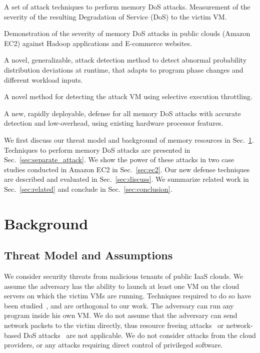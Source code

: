 \documentclass{sig-alternate}
\newcommand{\attackname}{memory DoS attacks\xspace}
\newcommand{\secref}[1]{\mbox{Sec.~\ref{#1}}\xspace}
\newenvironment{packeditemize}{
\begin{list}{}{
\setlength{\labelwidth}{8pt}
\setlength{\itemsep}{0pt}
\setlength{\leftmargin}{\labelwidth}
\addtolength{\leftmargin}{\labelsep}
\setlength{\parindent}{0pt}
\setlength{\listparindent}{\parindent}
\setlength{\parsep}{0pt}
\setlength{\topsep}{3pt}}}{\end{list}}
\begin{document}
\begin{packeditemize}

\item  A set of attack techniques to perform \attackname. Measurement of the 
severity of the resulting Degradation of Service (DoS) to the victim VM.

\item Demonstration of the severity of \attackname in public clouds (Amazon 
EC2) against Hadoop applications and E-commerce websites. 

\item A novel, generalizable, attack detection method to detect abnormal 
probability distribution deviations at runtime, that adapts to program phase 
changes and different workload inputs.

\item A novel method for detecting the attack VM using selective execution throttling.

\item A new, rapidly deployable, defense for all \attackname with accurate detection and low-overhead, using existing hardware processor features.

\end{packeditemize}

We first discuss our threat model 
and background of memory resources in \secref{sec:overview}. Techniques to 
perform \attackname are presented in \secref{sec:separate_attack}. We 
show the power of these attacks in two case studies conducted in Amazon EC2 
in \secref{sec:ec2}. Our new defense techniques are described and evaluated in
\secref{sec:discuss}. We summarize related work in \secref{sec:related} and
conclude in \secref{sec:conclusion}.


\section{Background}
\label{sec:overview}

\subsection{Threat Model and Assumptions}
\label{sec:threat_model}

We consider security threats from malicious tenants of public IaaS clouds.  We 
assume the adversary has the ability to launch at least one VM on the cloud 
servers on which the victim VMs are running. Techniques required to do so have 
been studied~\cite{RiTrSh:09, Varadarajan:2015:PVS, Xu:2015:MSC}, and are orthogonal to
our work. The adversary can run any program inside his own VM. We do not assume that the 
adversary can send network packets to the victim directly, thus resource freeing 
attacks~\cite{VaKoFa:12} or network-based DoS attacks~\cite{Li:10} are not 
applicable. We do not consider attacks from the cloud providers, or any attacks 
requiring direct control of privileged software.
\end{document}
